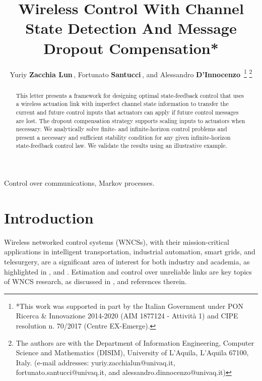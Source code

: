 \documentclass[letterpaper, 10 pt, conference]{ieeeconf}  %
\title{\LARGE \bf
Wireless Control With Channel State Detection And Message Dropout Compensation*
}
\author{Yuriy \textbf{Zacchia Lun}\,\textsuperscript{\orcidlink{0000-0002-9408-8773}}, Fortunato \textbf{Santucci}\,\textsuperscript{\orcidlink{0000-0002-0229-6277}}, and Alessandro \textbf{D'Innocenzo}\,\textsuperscript{\orcidlink{0000-0002-5239-0894}}%
\thanks{*This work was supported in part by the Italian Government under PON Ricerca \& Innovazione 2014-2020 (AIM
1877124 - Attivit\`{a} 1) and CIPE resolution n. 70/2017 (Centre %
EX-Emerge).}%
\thanks{The authors are with the 
Department of Information Engineering, Computer Science and Mathematics (DISIM), University of L'Aquila, L'Aquila 67100, Italy. (e-mail addresses:
        {\small yuriy.zacchialun@univaq.it}, {\small fortunato.santucci@univaq.it}, and {\small alessandro.dinnocenzo@univaq.it})}%
}
\begin{document}
\maketitle
\thispagestyle{empty}
\pagestyle{empty}

\begin{abstract}
This letter presents a framework for designing optimal state-feedback control that uses a wireless actuation link with imperfect channel state information to transfer the current and future control inputs that actuators can apply if future control messages are lost. The dropout compensation strategy supports scaling inputs to actuators when necessary. We analytically solve finite- and infinite-horizon control problems and present a necessary and sufficient stability condition for any given infinite-horizon state-feedback control law. We validate the results using an illustrative example.
\end{abstract}
\begin{keywords}
Control over communications, Markov processes.
\end{keywords}
\section{Introduction}\label{sec:intro}
Wireless networked control systems (WNCSs), with their mission-critical applications in intelligent transportation, industrial automation, smart grids, and telesurgery, are a significant area of interest for both industry and academia, as highlighted in \cite{park2018comm,liu2021iot}, and \cite{pezzutto2024arc}. Estimation and control over unreliable links are key topics of WNCS research, as discussed in \cite{park2018comm,pezzutto2024arc,yZL-2025-automatica}, and references therein. 
\end{document}
